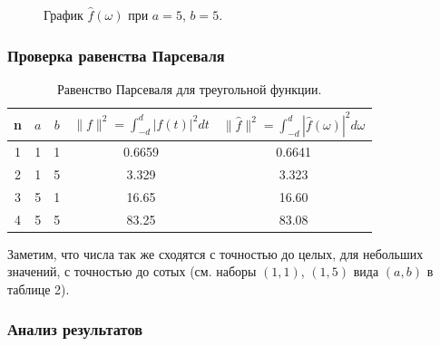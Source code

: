 \documentclass[a5paper, 10pt]{article}
\theoremstyle{definition}
\theoremstyle{plain}
\theoremstyle{remark}
\begin{document}
\begin{figure}[h!]
\caption{График $\hat{f}(\omega)$ при $a = 5$, $b = 5$.}
\end{figure}




\subsubsection{Проверка равенства Парсеваля}

\begin{table}[h!]
\caption{Равенство Парсеваля для треугольной функции.}
\label{tabular:timesandtenses}
\begin{center}
\begin{tabular}{|c|c|c|c|c|}
\hline
n & $a$ & $b$ & $\| f \|^2 = \int_{-d}^d |f(t)|^2 dt $ & $\| \hat{f} \|^2 = \int_{-d}^d |\hat{f}(\omega)|^2 d\omega $ \\
\hline
1 & 1 & 1 &  0.6659& 0.6641\\
\hline
2 & 1 & 5 & 3.329  & 3.323\\
\hline
3 & 5 & 1 & 16.65 &  16.60\\
\hline
4 & 5 & 5 & 83.25 & 83.08 \\
\hline
\end{tabular}
\end{center}
\end{table}

Заметим, что числа так же сходятся с точностью до целых, для небольших значений, с точностью до сотых (см. наборы $(1, 1)$, $(1, 5)$ вида $(a, b)$ в таблице 2).

\newpage
\subsubsection{Анализ результатов}
\end{document}
